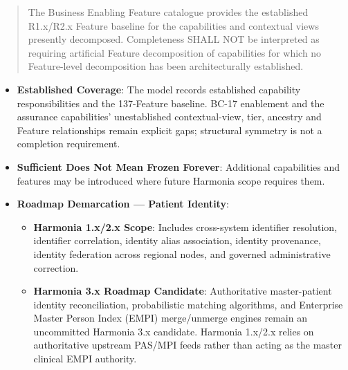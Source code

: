 \begin{quote}

The Business Enabling Feature catalogue provides the established R1.x/\allowbreak{}R2.x Feature baseline for the capabilities and contextual views presently decomposed. Completeness SHALL NOT be interpreted as requiring artificial Feature decomposition of capabilities for which no Feature-level decomposition has been architecturally established.


\end{quote}
\label{rad:enabling:63}

\begin{itemize}

\item 
\textbf{Established Coverage}: The model records established capability responsibilities and the 137-Feature baseline. BC-17 enablement and the assurance capabilities' unestablished contextual-view, tier, ancestry and Feature relationships remain explicit gaps; structural symmetry is not a completion requirement.



\item 
\textbf{Sufficient Does Not Mean Frozen Forever}: Additional capabilities and features may be introduced where future Harmonia scope requires them.



\item 
\textbf{Roadmap Demarcation — Patient Identity}:


\begin{itemize}

\item 
\textbf{Harmonia 1.x/\allowbreak{}2.x Scope}: Includes cross-system identifier resolution, identifier correlation, identity alias association, identity provenance, identity federation across regional nodes, and governed administrative correction.



\item 
\textbf{Harmonia 3.x Roadmap Candidate}: Authoritative master-patient identity reconciliation, probabilistic matching algorithms, and Enterprise Master Person Index (EMPI) merge/\allowbreak{}unmerge engines remain an uncommitted Harmonia 3.x candidate. Harmonia 1.x/\allowbreak{}2.x relies on authoritative upstream PAS/\allowbreak{}MPI feeds rather than acting as the master clinical EMPI authority.



\end{itemize}


\end{itemize}
\label{rad:enabling:69}

